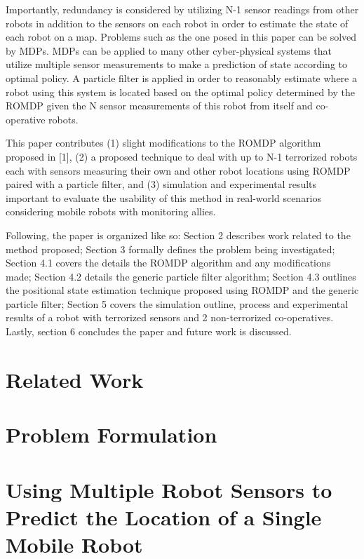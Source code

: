 \documentclass[conference]{IEEEtran}
\begin{document}
\par
Importantly, redundancy is considered by utilizing N-1 sensor readings from other robots in addition to the sensors on each robot in order to estimate the state of each robot on a map. Problems such as the one posed in this paper can be solved by MDPs. MDPs can be applied to many other cyber-physical systems that utilize multiple sensor measurements to make a prediction of state according to optimal policy. A particle filter is applied in order to reasonably estimate where a robot using this system is located based on the optimal policy determined by the ROMDP given the N sensor measurements of this robot from itself and co-operative robots.
\par
This paper contributes (1) slight modifications to the ROMDP algorithm proposed in [1], (2) a proposed technique to deal with up to N-1 terrorized robots each with sensors measuring their own and other robot locations using ROMDP paired with a particle filter, and (3) simulation and experimental results important to evaluate the usability of this method in real-world scenarios considering mobile robots with monitoring allies.
\par
Following, the paper is organized like so: Section 2 describes work related to the method proposed; Section 3 formally defines the problem being investigated; Section 4.1 covers the details the ROMDP algorithm and any modifications made; Section 4.2 details the generic particle filter algorithm; Section 4.3 outlines the positional state estimation technique proposed using ROMDP and the generic particle filter; Section 5 covers the simulation outline, process and experimental results of a robot with terrorized sensors and 2 non-terrorized co-operatives. Lastly, section 6 concludes the paper and future work is discussed.

\section{Related Work}


\section{Problem Formulation}



\section{Using Multiple Robot Sensors to Predict the Location of a Single Mobile Robot}
\end{document}
